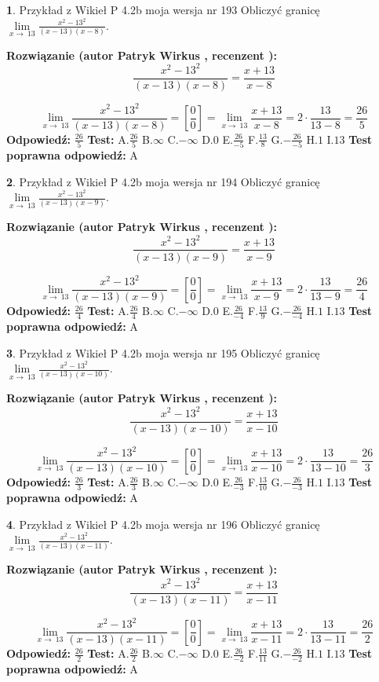 \documentclass[12pt, a4paper]{article}
\theoremstyle{definition} %
\newtheorem{zad}{}
\newcommand{\zadStart}[1]{\begin{zad}#1\newline}
\newcommand{\zadStop}{\end{zad}}
\newcommand{\rozwStart}[2]{\noindent \textbf{Rozwiązanie (autor #1 , recenzent #2): }\newline}
\newcommand{\rozwStop}{\newline}
\newcommand{\odpStart}{\noindent \textbf{Odpowiedź:}\newline}
\newcommand{\odpStop}{\newline}
\newcommand{\testStart}{\noindent \textbf{Test:}\newline}
\newcommand{\testStop}{\newline}
\newcommand{\kluczStart}{\noindent \textbf{Test poprawna odpowiedź:}\newline}
\newcommand{\kluczStop}{\newline}
\begin{document}
\zadStart{Przykład z Wikieł P 4.2b moja wersja nr 193}
Obliczyć granicę $\lim\limits_{x\to\ 13}\frac{x^{2}-13^{2}}{(x-13)(x-8)}$.
\zadStop
\rozwStart{Patryk Wirkus}{}
$$\frac{x^{2}-13^{2}}{(x-13)(x-8)}=\frac{x+13}{x-8}$$

$$\lim\limits_{x\to\ 13}\frac{x^{2}-13^{2}}{(x-13)(x-8)}=[\frac{0}{0}]=\lim\limits_{x\to\ 13}\frac{x+13}{x-8}=2 \cdot \frac{13}{13-8} = \frac{26}{5}$$
\rozwStop
\odpStart
$\frac{26}{5}$
\odpStop
\testStart
A.$\frac{26}{5}$
B.$\infty$
C.$-\infty$
D.$0$
E.$\frac{26}{-5}$
F.$\frac{13}{8}$
G.$-\frac{26}{-5}$
H.$1$
I.$13$
\testStop
\kluczStart
A
\kluczStop



\zadStart{Przykład z Wikieł P 4.2b moja wersja nr 194}
Obliczyć granicę $\lim\limits_{x\to\ 13}\frac{x^{2}-13^{2}}{(x-13)(x-9)}$.
\zadStop
\rozwStart{Patryk Wirkus}{}
$$\frac{x^{2}-13^{2}}{(x-13)(x-9)}=\frac{x+13}{x-9}$$

$$\lim\limits_{x\to\ 13}\frac{x^{2}-13^{2}}{(x-13)(x-9)}=[\frac{0}{0}]=\lim\limits_{x\to\ 13}\frac{x+13}{x-9}=2 \cdot \frac{13}{13-9} = \frac{26}{4}$$
\rozwStop
\odpStart
$\frac{26}{4}$
\odpStop
\testStart
A.$\frac{26}{4}$
B.$\infty$
C.$-\infty$
D.$0$
E.$\frac{26}{-4}$
F.$\frac{13}{9}$
G.$-\frac{26}{-4}$
H.$1$
I.$13$
\testStop
\kluczStart
A
\kluczStop



\zadStart{Przykład z Wikieł P 4.2b moja wersja nr 195}
Obliczyć granicę $\lim\limits_{x\to\ 13}\frac{x^{2}-13^{2}}{(x-13)(x-10)}$.
\zadStop
\rozwStart{Patryk Wirkus}{}
$$\frac{x^{2}-13^{2}}{(x-13)(x-10)}=\frac{x+13}{x-10}$$

$$\lim\limits_{x\to\ 13}\frac{x^{2}-13^{2}}{(x-13)(x-10)}=[\frac{0}{0}]=\lim\limits_{x\to\ 13}\frac{x+13}{x-10}=2 \cdot \frac{13}{13-10} = \frac{26}{3}$$
\rozwStop
\odpStart
$\frac{26}{3}$
\odpStop
\testStart
A.$\frac{26}{3}$
B.$\infty$
C.$-\infty$
D.$0$
E.$\frac{26}{-3}$
F.$\frac{13}{10}$
G.$-\frac{26}{-3}$
H.$1$
I.$13$
\testStop
\kluczStart
A
\kluczStop



\zadStart{Przykład z Wikieł P 4.2b moja wersja nr 196}
Obliczyć granicę $\lim\limits_{x\to\ 13}\frac{x^{2}-13^{2}}{(x-13)(x-11)}$.
\zadStop
\rozwStart{Patryk Wirkus}{}
$$\frac{x^{2}-13^{2}}{(x-13)(x-11)}=\frac{x+13}{x-11}$$

$$\lim\limits_{x\to\ 13}\frac{x^{2}-13^{2}}{(x-13)(x-11)}=[\frac{0}{0}]=\lim\limits_{x\to\ 13}\frac{x+13}{x-11}=2 \cdot \frac{13}{13-11} = \frac{26}{2}$$
\rozwStop
\odpStart
$\frac{26}{2}$
\odpStop
\testStart
A.$\frac{26}{2}$
B.$\infty$
C.$-\infty$
D.$0$
E.$\frac{26}{-2}$
F.$\frac{13}{11}$
G.$-\frac{26}{-2}$
H.$1$
I.$13$
\testStop
\kluczStart
A
\kluczStop
\end{document}
